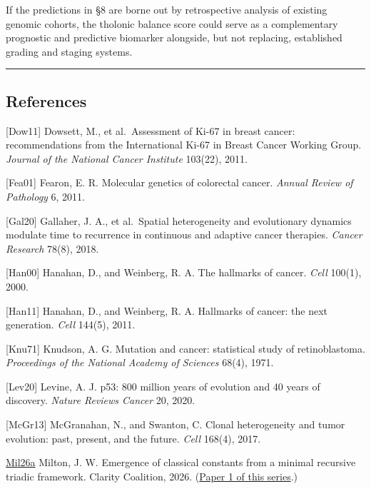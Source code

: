\documentclass[
  11pt,
  letterpaper,
]{article}
\begin{document}
If the predictions in §8 are borne out by retrospective analysis of
existing genomic cohorts, the tholonic balance score could serve as a
complementary prognostic and predictive biomarker alongside, but not
replacing, established grading and staging systems.

\begin{center}\rule{0.5\linewidth}{0.5pt}\end{center}

\subsection{References}\label{references}

{[}Dow11{]} Dowsett, M., et al.~Assessment of Ki-67 in breast cancer:
recommendations from the International Ki-67 in Breast Cancer Working
Group. \emph{Journal of the National Cancer Institute} 103(22), 2011.

{[}Fea01{]} Fearon, E. R. Molecular genetics of colorectal cancer.
\emph{Annual Review of Pathology} 6, 2011.

{[}Gal20{]} Gallaher, J. A., et al.~Spatial heterogeneity and
evolutionary dynamics modulate time to recurrence in continuous and
adaptive cancer therapies. \emph{Cancer Research} 78(8), 2018.

{[}Han00{]} Hanahan, D., and Weinberg, R. A. The hallmarks of cancer.
\emph{Cell} 100(1), 2000.

{[}Han11{]} Hanahan, D., and Weinberg, R. A. Hallmarks of cancer: the
next generation. \emph{Cell} 144(5), 2011.

{[}Knu71{]} Knudson, A. G. Mutation and cancer: statistical study of
retinoblastoma. \emph{Proceedings of the National Academy of Sciences}
68(4), 1971.

{[}Lev20{]} Levine, A. J. p53: 800 million years of evolution and 40
years of discovery. \emph{Nature Reviews Cancer} 20, 2020.

{[}McGr13{]} McGranahan, N., and Swanton, C. Clonal heterogeneity and
tumor evolution: past, present, and the future. \emph{Cell} 168(4),
2017.

\href{https://github.com/baardev/truevalue/blob/main/docnav/Research/papers/1_recursive-tholonic-five-constants/1_recursive-tholonic-five-constants.pdf}{Mil26a}
Milton, J. W. Emergence of classical constants from a minimal recursive
triadic framework. Clarity Coalition, 2026.
(\href{https://github.com/baardev/truevalue/blob/main/docnav/Research/papers/1_recursive-tholonic-five-constants/1_recursive-tholonic-five-constants.pdf}{Paper
1 of this series}.)
\end{document}
